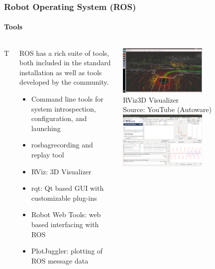 \begin{frame}
\frametitle{Robot Operating System (ROS)}
\framesubtitle{Tools}
\begin{columns}{T}
    \begin{column}{0.65\textwidth}
        \footnotesize
        ROS has a rich suite of tools, both included in the standard installation as
        well as tools developed by the community.\\
        \begin{itemize}
            \item Command line tools for system introspection, configuration,
                and launching
            \item rosbag\footnotemark[1] recording and replay tool
            \item RViz\footnotemark[2]: 3D Visualizer
            \item rqt\footnotemark[3]: Qt based GUI with customizable plug-ins
            \item Robot Web Tools\footnotemark[4]: web based interfacing with ROS
            \item PlotJuggler\footnotemark[5]: plotting of ROS message data 
        \end{itemize}
    \end{column}
    \begin{column}{0.35\textwidth}
        \centering
        \includegraphics[width=0.6\textwidth]{images/rviz.jpg}\\
        \scriptsize RViz\footnotemark[2] 3D Visualizer\\
        Source: YouTube (Autoware)\footnotemark[6]\\
        \vspace{0.25cm}
        \includegraphics[width=0.6\textwidth]{images/rqt.png}\\

\end{column}
\end{columns}
\end{frame}

